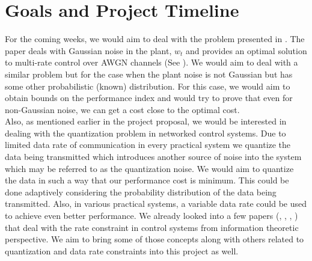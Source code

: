 \documentclass[12pt]{caltech_thesis_progress1}
\begin{document}
\chapter{Goals and Project Timeline}
For the coming weeks, we would aim to deal with the problem presented in \cite{anatoly}. The paper deals with Gaussian noise in the plant, $w_{t}$ and provides an optimal solution to multi-rate control over AWGN channels (See \cite{anatoly}). We would aim to deal with a similar problem but for the case when the plant noise is not Gaussian but has some other probabilistic (known) distribution. For this case, we would aim to obtain bounds on the performance index and would try to prove that even for non-Gaussian noise, we can get a cost close to the optimal cost. \\ 
Also, as mentioned earlier in the project proposal, we would be interested in dealing with the quantization problem in networked control systems. Due to limited data rate of communication in every practical system we quantize the data being transmitted which introduces another source of noise into the system which may be referred to as the quantization noise. We would aim to quantize the data in such a way that our performance  cost is minimum. This could be done adaptively considering the probability distribution of the data being transmitted. Also, in various practical systems, a variable data rate could be used to achieve even better performance. We already looked into a few papers (\cite{gireeja}, \cite{tatikonda},  \cite{rate1}, \cite{rate2}) that deal with the rate constraint in control systems from information theoretic perspective. We aim to bring some of those concepts along with others related to quantization and data rate constraints into this project as well.



\end{document}
